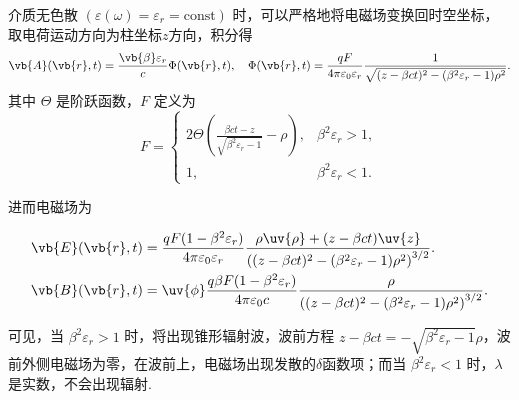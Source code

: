 \begin{example}
	介质无色散 \((\varepsilon(\omega) = \varepsilon_{r} = \text{const})\) 时，可以严格地将电磁场变换回时空坐标，取电荷运动方向为柱坐标\(z\)方向，积分得
	\begin{equation*}
		\vb{A}(\vb{r},t) = \frac{\vb{\beta} \varepsilon_{r}}{c} \Phi(\vb{r},t), \quad
		\Phi(\vb{r},t) = \frac{q F}{4\pi \varepsilon_{0} \varepsilon_{r}} \frac{1}{\sqrt{(z - \beta c t)^{2} - (\beta^{2} \varepsilon_{r} - 1) \rho^{2}}}.
	\end{equation*}
	其中 \(\Theta\) 是阶跃函数，\(F\) 定义为
	\begin{equation*}
		F =
		\begin{cases}
			2 \Theta \left( \frac{\beta c t - z}{\sqrt{\beta^{2} \varepsilon_{r} - 1}} - \rho \right), & \beta^{2} \varepsilon_{r} > 1, \\
			1,                                                                                         & \beta^{2} \varepsilon_{r} < 1.
		\end{cases}
	\end{equation*}

	进而电磁场为

	\begin{align*}
		\vb{E}(\vb{r},t) &= \frac{q F (1 - \beta^{2} \varepsilon_{r})}{4\pi \varepsilon_{0} \varepsilon_{r}} \frac{\rho \uv{\rho} + (z - \beta c t) \uv{z}}{\left( (z - \beta c t)^{2} - (\beta^{2} \varepsilon_{r} - 1) \rho^{2} \right)^{3/2}}.\\
		\vb{B}(\vb{r},t) &= \uv{\phi} \frac{q \beta F (1 - \beta^{2} \varepsilon_{r})}{4\pi \varepsilon_{0} c} \frac{\rho}{\left( (z - \beta c t)^{2} - (\beta^{2} \varepsilon_{r} - 1) \rho^{2} \right)^{3/2}}.
	\end{align*}

	可见，当 \(\beta^{2} \varepsilon_{r} > 1\) 时，将出现锥形辐射波，波前方程 \(z - \beta c t = -\sqrt{\beta^{2} \varepsilon_{r} - 1} \rho\)，波前外侧电磁场为零，在波前上，电磁场出现发散的\(\delta\)函数项；而当 \(\beta^{2} \varepsilon_{r} < 1\) 时，\(\lambda\) 是实数，不会出现辐射.
\end{example}

